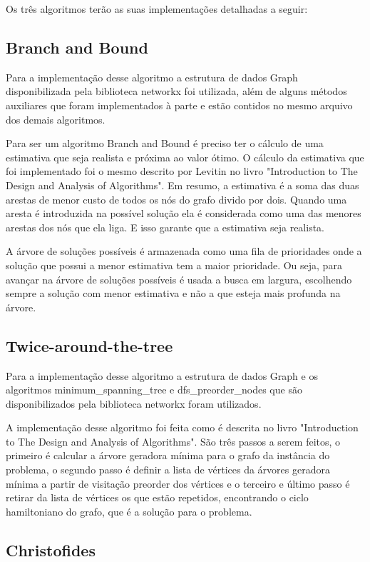 \documentclass[12pt]{article}
\begin{document}
Os três algoritmos terão as suas implementações detalhadas a seguir:

\subsection{Branch and Bound}

Para a implementação desse algoritmo a estrutura de dados Graph disponibilizada pela biblioteca networkx foi utilizada, além de alguns métodos auxiliares que foram implementados à parte e estão contidos no mesmo arquivo dos demais algoritmos.

Para ser um algoritmo Branch and Bound é preciso ter o cálculo de uma estimativa que seja realista e próxima ao valor ótimo. O cálculo da estimativa que foi implementado foi o mesmo descrito por Levitin no livro "Introduction to The Design and Analysis of Algorithms". Em resumo, a estimativa é a soma das duas arestas de menor custo de todos os nós do grafo divido por dois. Quando uma aresta é introduzida na possível solução ela é considerada como uma das menores arestas dos nós que ela liga. E isso garante que a estimativa seja realista.

A árvore de soluções possíveis é armazenada como uma fila de prioridades onde a solução que possui a menor estimativa tem a maior prioridade. Ou seja, para avançar na árvore de soluções possíveis é usada a busca em largura, escolhendo sempre a solução com menor estimativa e não a que esteja mais profunda na árvore.

\subsection{Twice-around-the-tree}

Para a implementação desse algoritmo a estrutura de dados Graph e os algoritmos minimum\_spanning\_tree e dfs\_preorder\_nodes que são disponibilizados pela biblioteca networkx foram utilizados.

A implementação desse algoritmo foi feita como é descrita no livro "Introduction to The Design and Analysis of Algorithms". São três passos a serem feitos, o primeiro é calcular a árvore geradora mínima para o grafo da instância do problema, o segundo passo é definir a lista de vértices da árvores geradora mínima a partir de visitação preorder dos vértices e o terceiro e último passo é retirar da lista de vértices os que estão repetidos, encontrando o ciclo hamiltoniano do grafo, que é a solução para o problema.

\subsection{Christofides}
\end{document}
